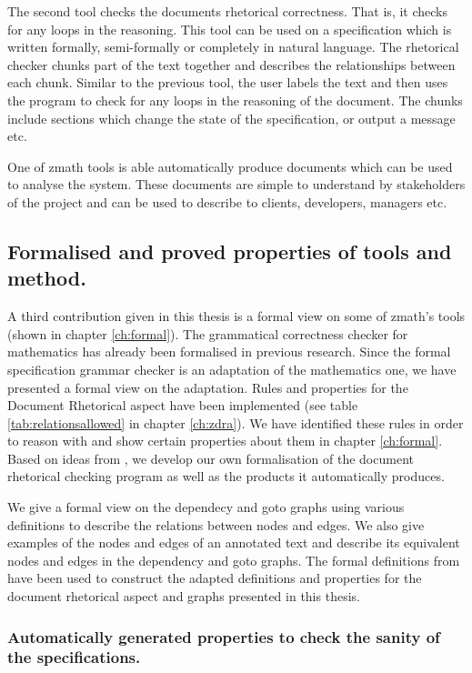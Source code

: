 The second tool checks the documents rhetorical correctness. That is, it checks for any loops in the reasoning. This tool can be used on a specification which is written formally, semi-formally or completely in natural language. The rhetorical checker chunks part of the text together and describes the relationships between each chunk. Similar to the previous tool, the user labels the text and then uses the program to check for any loops in the reasoning of the document. The chunks include sections which change the state of the specification, or output a message etc.

One of \gls{zmath} tools is able automatically produce documents which can be used to analyse the system. These documents are simple to understand by stakeholders of the project and can be used to describe to clients, developers, managers etc. 

\subsection{Formalised and proved properties of tools and method.}

A third contribution given in this thesis is a formal view on some of \gls{zmath}'s tools (shown in chapter \ref{ch:formal}). The grammatical correctness checker for mathematics has already been formalised in previous research. Since the formal specification grammar checker is an adaptation of the mathematics one, we have presented a formal view on the adaptation. Rules and properties for the Document Rhetorical aspect have been implemented (see table \ref{tab:relationsallowed} in chapter \ref{ch:zdra}). We have identified these rules in order to reason with and show certain properties about them in chapter \ref{ch:formal}. Based on ideas from \cite{zengfirstyear}, we develop our own formalisation of the document rhetorical checking program as well as the products it automatically produces. 

We give a formal view on the dependecy and goto graphs using various definitions to describe the relations between nodes and edges. We also give examples of the nodes and edges of an annotated text and describe its equivalent nodes and edges in the dependency and goto graphs. The formal definitions from \cite{zengfirstyear} have been used to construct the adapted definitions and properties for the document rhetorical aspect and graphs presented in this thesis.

\subsubsection{Automatically generated properties to check the sanity of the specifications.}

